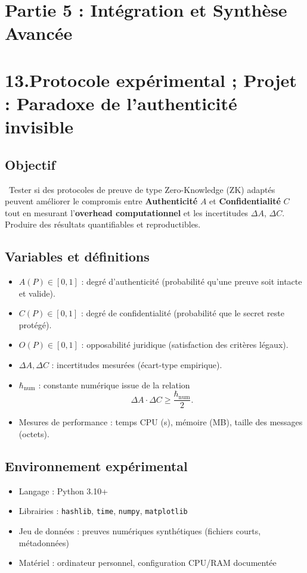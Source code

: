 \documentclass[12pt,a4paper]{report}
\begin{document}
{	\section*{Partie 5 : Intégration et Synthèse Avancée}
	\section*{13.Protocole expérimental ; Projet : Paradoxe de l’authenticité invisible}
	
	\subsection*{Objectif}\
	Tester si des protocoles de preuve de type Zero-Knowledge (ZK) adaptés peuvent améliorer le compromis entre \textbf{Authenticité} $A$ et \textbf{Confidentialité} $C$ tout en mesurant l’\textbf{overhead computationnel} et les incertitudes $\Delta A$, $\Delta C$. Produire des résultats quantifiables et reproductibles.
	
	\subsection*{Variables et définitions}
	\begin{itemize}
		\item $A(P) \in [0,1]$ : degré d’authenticité (probabilité qu’une preuve soit intacte et valide).
		\item $C(P) \in [0,1]$ : degré de confidentialité (probabilité que le secret reste protégé).
		\item $O(P) \in [0,1]$ : opposabilité juridique (satisfaction des critères légaux).
		\item $\Delta A, \Delta C$ : incertitudes mesurées (écart-type empirique).
		\item $\hbar_{\text{num}}$ : constante numérique issue de la relation 
		\[
		\Delta A \cdot \Delta C \geq \frac{\hbar_{\text{num}}}{2}.
		\]
		\item Mesures de performance : temps CPU (s), mémoire (MB), taille des messages (octets).
	\end{itemize}
	
	\subsection*{Environnement expérimental}
	\begin{itemize}
		\item Langage : Python 3.10+
		\item Librairies : \texttt{hashlib}, \texttt{time}, \texttt{numpy}, \texttt{matplotlib}
		\item Jeu de données : preuves numériques synthétiques (fichiers courts, métadonnées)
		\item Matériel : ordinateur personnel, configuration CPU/RAM documentée
	\end{itemize}
	
}
\end{document}
